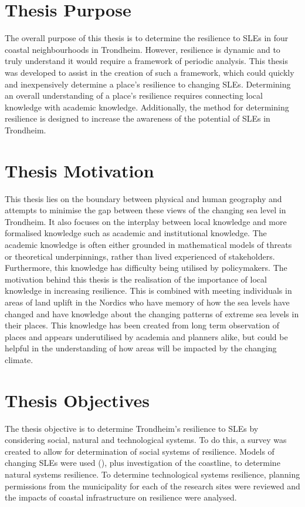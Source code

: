 \paragraph{}

\section{Thesis Purpose}
The overall purpose of this thesis is to determine the resilience to SLEs in four coastal neighbourhoods in Trondheim. However, resilience is dynamic and to truly understand it would require a framework of periodic analysis. This thesis was developed to assist in the creation of such a framework, which could quickly and inexpensively determine a place's resilience to changing SLEs. Determining an overall understanding of a place's resilience requires connecting local knowledge with academic knowledge. Additionally, the method for determining resilience is designed to increase the awareness of the potential of SLEs in Trondheim. 

\section{Thesis Motivation}
 This thesis lies on the boundary between physical and human geography and attempts to minimise the gap between these views of the changing sea level in Trondheim. It also focuses on the interplay between local knowledge and more formalised knowledge such as academic and institutional knowledge. The academic knowledge is often either grounded in mathematical models of threats or theoretical underpinnings, rather than lived experienced of stakeholders. Furthermore, this knowledge has difficulty being utilised by policymakers. The motivation behind this thesis is the realisation of the importance of local knowledge in increasing resilience. This is combined with meeting individuals in areas of land uplift in the Nordics who have memory of how the sea levels have changed and have knowledge about the changing patterns of extreme sea levels in their places. This knowledge has been created from long term observation of places and appears underutilised by academia and planners alike, but could be helpful in the understanding of how areas will be impacted by the changing climate. 



\section{Thesis Objectives}
The thesis objective is to determine Trondheim's resilience to SLEs by considering social, natural and technological systems. To do this, a survey was created to allow for determination of social systems of resilience.  Models of changing SLEs were used (\cite{kartverket_se_2020}), plus investigation of the coastline, to determine natural systems resilience. To determine technological systems resilience, planning permissions from the municipality for each of the research sites were reviewed and the impacts of coastal infrastructure on resilience were analysed.

